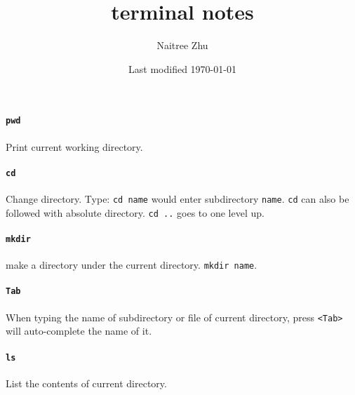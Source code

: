 \documentclass{article}
\title{terminal notes}
\author{Naitree Zhu}
\date{Last modified \today}
\begin{document}
\maketitle

\paragraph{\texttt{pwd}} Print current working directory.

\paragraph{\texttt{cd}} Change directory. Type: \verb|cd name| would enter subdirectory \verb|name|. \verb|cd| can also be followed with absolute directory. \verb|cd ..| goes to one level up.

\paragraph{\texttt{mkdir}} make a directory under the current directory. \verb|mkdir name|.

\paragraph{\texttt{Tab}} When typing the name of subdirectory or file of current directory, press \verb|<Tab>| will auto-complete the name of it.

\paragraph{\texttt{ls}} List the contents of current directory.
\end{document}
